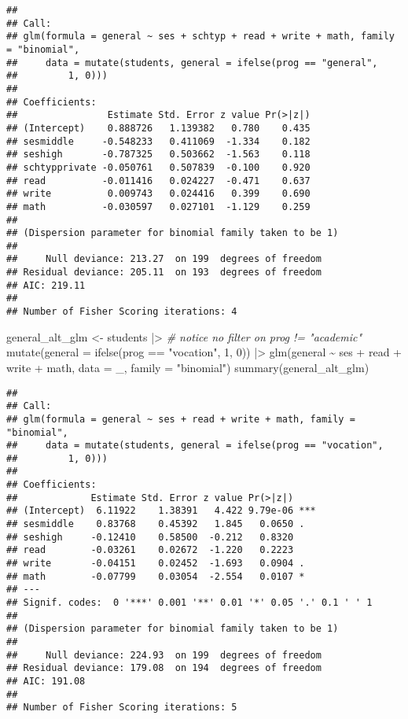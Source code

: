 \documentclass[
  oneside]{book}
\newenvironment{Shaded}{\begin{snugshade}}{\end{snugshade}}
\newcommand{\AttributeTok}[1]{\textcolor[rgb]{0.77,0.63,0.00}{#1}}
\newcommand{\CommentTok}[1]{\textcolor[rgb]{0.56,0.35,0.01}{\textit{#1}}}
\newcommand{\DecValTok}[1]{\textcolor[rgb]{0.00,0.00,0.81}{#1}}
\newcommand{\FunctionTok}[1]{\textcolor[rgb]{0.00,0.00,0.00}{#1}}
\newcommand{\NormalTok}[1]{#1}
\newcommand{\OtherTok}[1]{\textcolor[rgb]{0.56,0.35,0.01}{#1}}
\newcommand{\SpecialCharTok}[1]{\textcolor[rgb]{0.00,0.00,0.00}{#1}}
\newcommand{\StringTok}[1]{\textcolor[rgb]{0.31,0.60,0.02}{#1}}
\begin{document}
\begin{verbatim}
## 
## Call:
## glm(formula = general ~ ses + schtyp + read + write + math, family = "binomial", 
##     data = mutate(students, general = ifelse(prog == "general", 
##         1, 0)))
## 
## Coefficients:
##                Estimate Std. Error z value Pr(>|z|)
## (Intercept)    0.888726   1.139382   0.780    0.435
## sesmiddle     -0.548233   0.411069  -1.334    0.182
## seshigh       -0.787325   0.503662  -1.563    0.118
## schtypprivate -0.050761   0.507839  -0.100    0.920
## read          -0.011416   0.024227  -0.471    0.637
## write          0.009743   0.024416   0.399    0.690
## math          -0.030597   0.027101  -1.129    0.259
## 
## (Dispersion parameter for binomial family taken to be 1)
## 
##     Null deviance: 213.27  on 199  degrees of freedom
## Residual deviance: 205.11  on 193  degrees of freedom
## AIC: 219.11
## 
## Number of Fisher Scoring iterations: 4
\end{verbatim}

\begin{Shaded}
\begin{Highlighting}[]
\NormalTok{general\_alt\_glm }\OtherTok{\textless{}{-}}\NormalTok{ students }\SpecialCharTok{|\textgreater{}} \CommentTok{\# notice no filter on prog != "academic"}
  \FunctionTok{mutate}\NormalTok{(}\AttributeTok{general =} \FunctionTok{ifelse}\NormalTok{(prog }\SpecialCharTok{==} \StringTok{"vocation"}\NormalTok{, }\DecValTok{1}\NormalTok{, }\DecValTok{0}\NormalTok{)) }\SpecialCharTok{|\textgreater{}}
  \FunctionTok{glm}\NormalTok{(general }\SpecialCharTok{\textasciitilde{}}\NormalTok{ ses }\SpecialCharTok{+}\NormalTok{ read }\SpecialCharTok{+}\NormalTok{ write }\SpecialCharTok{+}\NormalTok{ math,}
    \AttributeTok{data =}\NormalTok{ \_, }\AttributeTok{family =} \StringTok{"binomial"}\NormalTok{)}
\FunctionTok{summary}\NormalTok{(general\_alt\_glm)}
\end{Highlighting}
\end{Shaded}

\begin{verbatim}
## 
## Call:
## glm(formula = general ~ ses + read + write + math, family = "binomial", 
##     data = mutate(students, general = ifelse(prog == "vocation", 
##         1, 0)))
## 
## Coefficients:
##             Estimate Std. Error z value Pr(>|z|)    
## (Intercept)  6.11922    1.38391   4.422 9.79e-06 ***
## sesmiddle    0.83768    0.45392   1.845   0.0650 .  
## seshigh     -0.12410    0.58500  -0.212   0.8320    
## read        -0.03261    0.02672  -1.220   0.2223    
## write       -0.04151    0.02452  -1.693   0.0904 .  
## math        -0.07799    0.03054  -2.554   0.0107 *  
## ---
## Signif. codes:  0 '***' 0.001 '**' 0.01 '*' 0.05 '.' 0.1 ' ' 1
## 
## (Dispersion parameter for binomial family taken to be 1)
## 
##     Null deviance: 224.93  on 199  degrees of freedom
## Residual deviance: 179.08  on 194  degrees of freedom
## AIC: 191.08
## 
## Number of Fisher Scoring iterations: 5
\end{verbatim}
\end{document}
